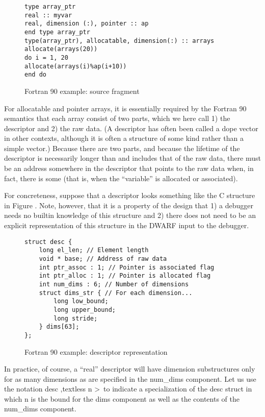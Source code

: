 \begin{figure}[here]
\begin{lstlisting}
type array_ptr
real :: myvar
real, dimension (:), pointer :: ap
end type array_ptr
type(array_ptr), allocatable, dimension(:) :: arrays
allocate(arrays(20))
do i = 1, 20
allocate(arrays(i)%ap(i+10))
end do
\end{lstlisting}
\caption{Fortran 90 example: source fragment} \label{fig:fortran90examplesourcefragment}
\end{figure}

For allocatable and pointer arrays, it is essentially required
by the Fortran 90 semantics that each array consist of 
two
parts, which we here call 1) the descriptor and 2) the raw
data. (A descriptor has often been called a dope vector in
other contexts, although it is often a structure of some kind
rather than a simple vector.) Because there are two parts,
and because the lifetime of the descriptor is necessarily
longer than and includes that of the raw data, there must be
an address somewhere in the descriptor that points to the
raw data when, in fact, there is some (that is, when 
the ``variable'' is allocated or associated).

For concreteness, suppose that a descriptor looks something
like the C structure in 
Figure .
Note, however, that it is
a property of the design that 1) a debugger needs no builtin
knowledge of this structure and 2) there does not need to
be an explicit representation of this structure in the DWARF
input to the debugger.

\begin{figure}[here]
\begin{lstlisting}
struct desc {
    long el_len; // Element length
    void * base; // Address of raw data
    int ptr_assoc : 1; // Pointer is associated flag
    int ptr_alloc : 1; // Pointer is allocated flag
    int num_dims : 6; // Number of dimensions
    struct dims_str { // For each dimension...  
        long low_bound;
        long upper_bound;
        long stride;
    } dims[63];
};
\end{lstlisting}
\caption{Fortran 90 example: descriptor representation} \label{fig:fortran90exampledescriptorrepresentation}
\end{figure}


In practice, of course, a “real” descriptor will have
dimension substructures only for as many dimensions as are
specified in the num\_dims component. Let us use the notation
desc ,textless n \textgreater\   
to indicate a specialization of the desc struct in
which n is the bound for the dims component as well as the
contents of the num\_dims component.

